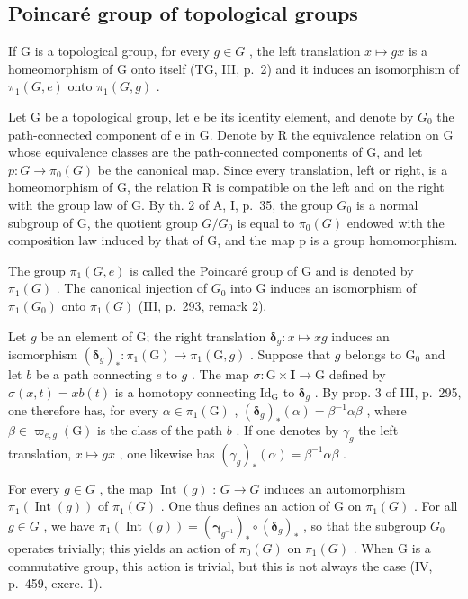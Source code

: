 \subsection{Poincaré group of topological groups}

If G is a topological group, for every \(g \in G\) , the left translation \(x \mapsto gx\) is a homeomorphism of G onto itself (TG, III, p.~2) and it induces an isomorphism of \(\pi_{1}(G, e)\) onto \(\pi_{1}(G, g)\) .

Let G be a topological group, let e be its identity element, and denote by \(G_{0}\) the path-connected component of e in G. Denote by R the equivalence relation on G whose equivalence classes are the path-connected components of G, and let \(p: G \to \pi_{0}(G)\) be the canonical map. Since every translation, left or right, is a homeomorphism of G, the relation R is compatible on the left and on the right with the group law of G. By th. 2 of A, I, p.~35, the group \(G_{0}\) is a normal subgroup of G, the quotient group \(G/G_{0}\) is equal to \(\pi_{0}(G)\) endowed with the composition law induced by that of G, and the map p is a group homomorphism.

The group \(\pi_{1}(G,e)\) is called the Poincaré group of G and is denoted by \(\pi_{1}(G)\) . The canonical injection of \(G_{0}\) into G induces an isomorphism of \(\pi_{1}(G_{0})\) onto \(\pi_{1}(G)\) (III, p.~293, remark 2).

Let \(g\) be an element of G; the right translation \(\boldsymbol{\delta}_g \colon x \mapsto xg\) induces an isomorphism \((\boldsymbol{\delta}_g)_* \colon \pi_1(\mathrm{G}) \to \pi_1(\mathrm{G}, g)\) . Suppose that \(g\) belongs to \(\mathrm{G}_0\) and let \(b\) be a path connecting \(e\) to \(g\) . The map \(\sigma \colon \mathrm{G} \times \mathbf{I} \to \mathrm{G}\) defined by \(\sigma(x, t) = xb(t)\) is a homotopy connecting \(\mathrm{Id}_{\mathrm{G}}\) to \(\boldsymbol{\delta}_g\) . By prop. 3 of III, p.~295, one therefore has, for every \(\alpha \in \pi_1(\mathrm{G})\) , \((\boldsymbol{\delta}_g)_*(\alpha) = \beta^{-1}\alpha\beta\) , where \(\beta \in \varpi_{e,g}(\mathrm{G})\) is the class of the path \(b\) . If one denotes by \(\gamma_g\) the left translation, \(x \mapsto gx\) , one likewise has \((\gamma_g)_*(\alpha) = \beta^{-1}\alpha\beta\) .

For every \(g \in G\) , the map \(\operatorname{Int}(g)\) : \(G \to G\) induces an automorphism \(\pi_{1}(\operatorname{Int}(g))\) of \(\pi_{1}(G)\) . One thus defines an action of G on \(\pi_{1}(G)\) . For all \(g \in G\) , we have \(\pi_{1}(\operatorname{Int}(g)) = (\boldsymbol{\gamma}_{g^{-1}})_{*} \circ (\boldsymbol{\delta}_{g})_{*}\) , so that the subgroup \(G_{0}\) operates trivially; this yields an action of \(\pi_{0}(G)\) on \(\pi_{1}(G)\) . When G is a commutative group, this action is trivial, but this is not always the case (IV, p.~459, exerc. 1).

